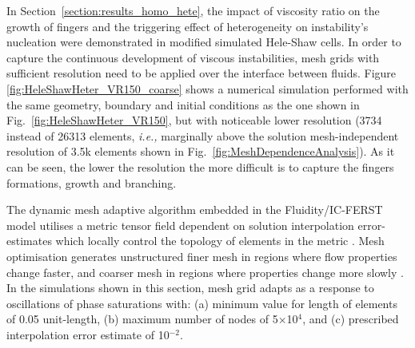\documentclass[preprint,authoryear,12pt]{elsarticle}
\newcommand{\eg}{{\it e.g., }}
\newcommand{\ie}{{\it i.e., }}
\begin{document}
In Section~\ref{section:results_homo_hete}, the impact of viscosity ratio on the growth of fingers and the triggering effect of heterogeneity on instability's nucleation were demonstrated in modified simulated Hele-Shaw cells. In order to capture the continuous development of viscous instabilities, mesh grids with sufficient resolution need to be applied over the interface between fluids. Figure \ref{fig:HeleShawHeter_VR150_coarse} shows a numerical simulation performed with the same geometry, boundary and initial conditions as the one shown in Fig.~\ref{fig:HeleShawHeter_VR150}, but with noticeable lower resolution (3734 instead of 26313 elements, \ie marginally above the solution mesh-independent resolution of 3.5k elements shown in Fig.~\ref{fig:MeshDependenceAnalysis}). As it can be seen, the lower the resolution the more difficult is to capture the fingers formations, growth and branching.


The dynamic mesh adaptive algorithm embedded in the Fluidity/IC-FERST model utilises a metric tensor field dependent on solution interpolation error-estimates which locally control the topology of elements in the metric \citep{pain_2001,power_2006}. Mesh optimisation generates unstructured finer mesh in regions where flow properties change faster, and coarser mesh in regions where properties change more slowly \citep{piggott_2006,hiester_2014,mostaghimi_2016}. %
In the simulations shown in this section, mesh grid adapts as a response to oscillations of phase saturations with: (a) minimum value for length of elements of 0.05 unit-length, (b) maximum number of nodes of 5$\times$10$^{4}$, and (c) prescribed interpolation error estimate of 10$^{-2}$.  
\end{document}
